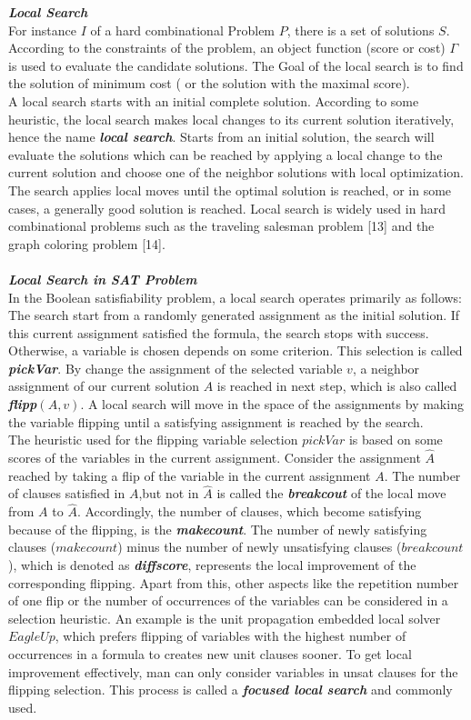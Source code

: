 \documentclass[12pt,a4paper,twoside]{scrartcl}
\numberwithin{equation}{section}
\begin{document}
\emph{\textbf{Local Search}}\\
For instance $I$ of a hard combinational Problem $P$, there is a set of solutions $S$.  According to the constraints of the problem, an object function (score or cost) $\Gamma$ is used to evaluate the candidate solutions. The Goal of the local search is to find the solution of minimum cost ( or the solution with the maximal score).\\
A local search starts with an initial complete solution. According to some heuristic, the local search makes local changes to its current solution iteratively, hence the name \emph{\textbf{local search}}. Starts from an initial solution, the search will evaluate the solutions which can be reached by applying a local change to the current solution and choose one of the neighbor solutions with local optimization. The search applies local moves until the optimal solution is reached, or in some cases, a generally good solution is reached.  Local search is widely used in hard combinational problems such as the traveling salesman problem [13] and the graph coloring problem [14]. \\
\\
\emph{\textbf{Local Search in SAT Problem}}\\
In the Boolean satisfiability problem, a local search operates primarily as follows: The search start from a randomly generated assignment as the initial solution. If this current assignment satisfied the formula, the search stops with success. Otherwise, a variable is chosen depends on some criterion. This selection is called \emph{\textbf{pickVar}}. By change the assignment of the selected variable $v$, a neighbor assignment of our current solution $A$ is reached in next step, which is also called  \emph{\textbf{flipp$(A,v)$}}. A local search will move in the space of the assignments by making the variable flipping until a satisfying assignment is reached by the search. \\
The heuristic used for the flipping variable selection $pickVar$  is based on some scores of the variables in the current assignment. Consider the assignment $\hat{A}$  reached by taking a flip of the variable in the current assignment $A$. The number of clauses satisfied in $A$,but not in $\hat{A}$ is called the \emph{\textbf{breakcout}} of the local move from $A$ to $\hat{A}$. Accordingly, the number of clauses, which become satisfying because of the flipping, is the  \emph{\textbf{makecount}}. The number of newly satisfying clauses ($makecount$) minus the number of newly unsatisfying clauses ($breakcount$), which is denoted as \emph{\textbf{diffscore}}, represents the local improvement of the corresponding flipping. Apart from this, other aspects like the repetition number of one flip or the number of occurrences of the variables can be considered in a selection heuristic. An example is the unit propagation embedded local solver $EagleUp$, which prefers flipping of variables with the highest number of occurrences in a formula to creates new unit clauses sooner. To get local improvement effectively, man can only consider variables in unsat clauses for the flipping selection. This process is called a \emph{\textbf{focused local search}} and commonly used. \\
\end{document}

